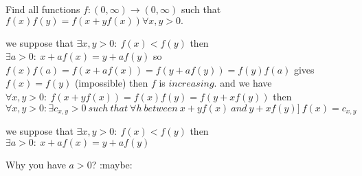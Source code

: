 \begin{mysolution}
	\begin{tcolorbox}Find all functions $ f: (0,\infty)\to (0,\infty)$ such that $ f(x)f(y)=f(x+yf(x))\forall x,y>0.$\end{tcolorbox}

we suppose that $ \exists x,y>0: \ f(x)<f(y)$ then $ \exists a>0: \ x+af(x)=y+af(y)$
so $ f(x)f(a)=f(x+af(x))=f(y+af(y))=f(y)f(a)$ gives $ f(x)=f(y)$ (impossible)
then $ f$ is $ increasing$.
and we have $ \forall x,y>0: \ f(x+yf(x))=f(x)f(y)=f(y+xf(y))$ then 
$ {\forall x,y>0: \exists c_{x,y}>0\ such\ that\ \forall h\ between\ x+yf(x)\ and\ y+xf(y)]\ f(x)=c_{x,y}}$ 
\end{mysolution}



\begin{mysolution}
	\begin{tcolorbox}

we suppose that $ \exists x,y>0: \ f(x)<f(y)$ then $ \exists a>0: \ x+af(x)=y+af(y)$
\end{tcolorbox}
Why you have $ a>0$?  :maybe:
\end{mysolution}



